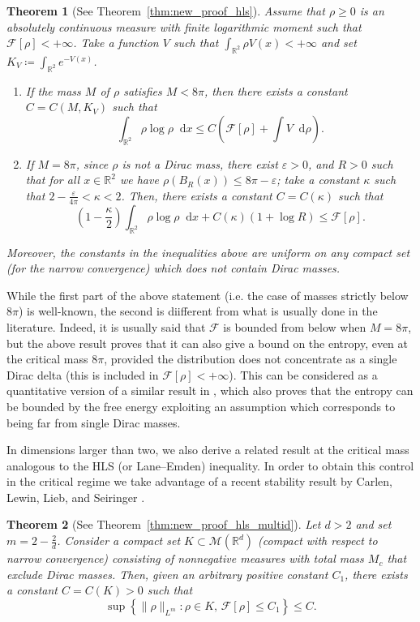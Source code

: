 \documentclass[11pt,a4paper]{article}
\numberwithin{equation}{section}
\newcommand{\R}{{\mathbb{R}}}
\theoremstyle{plain}
\newtheorem{theorem}{Theorem}[section]
\theoremstyle{remark}
\newcommand {\f}{\frac}
\newcommand{\diff}{\mathop{}\!\mathrm{d}}
\begin{document}
\begin{theorem}[See Theorem~\ref{thm:new_proof_hls}]
Assume that $\rho\ge 0$ is an absolutely continuous measure with finite logarithmic moment such that $\mathcal{F}[\rho]<+\infty$. Take a function $V$ such that $\int_{\R^2}\rho V(x)<+\infty$ and set $K_V \coloneqq \int_{\R^2}e^{-V(x)}$. 
\begin{enumerate}
    \item If the mass $M$ of $\rho$ satisfies $M<8\pi$, then there exists a constant $C=C(M,K_V)$ such that
    $$
        \int_{\R^2}\rho\log\rho\diff x\leq C \left(\mathcal{F}[\rho]+\int V\diff\rho \right).
    $$
    \item If $M=8\pi$, since $\rho$ is not a  Dirac mass,  there exist $\varepsilon>0$, and $R>0$ such that for all $x\in\R^2$ we have $\rho(
B_{R}(x))\leq 8\pi-\varepsilon$; take a constant $\kappa$ such that  $2 - \f{\varepsilon}{4\pi}<\kappa<2$. Then, there exists a constant $C=C(\kappa)$  such that
$$
\left(1-\frac{\kappa}{2}\right)\int_{\R^2}\rho\log\rho\diff x +  C(\kappa)(1+\log R)\le \mathcal{F}[\rho].
$$
\end{enumerate}
Moreover, the constants in the inequalities above are uniform on any compact set (for the narrow convergence) which does not contain Dirac masses.
\end{theorem}

While the first part of the above statement (i.e. the case of masses strictly below $8\pi$) is well-known, the second is diifferent from what is usually done in the literature. Indeed, it is usually said that $\mathcal F$ is bounded from below when $M=8\pi$, but the above result proves that it can also give a bound on the entropy, even at the critical mass $8\pi$, provided the distribution does not concentrate as a single Dirac delta (this is included in $\mathcal{F}[\rho]<+\infty$). This can be considered as a quantitative version of a similar result in \cite{KarWol}, which also proves that the entropy can be bounded by the free energy exploiting an assumption which corresponds to being far from single Dirac masses.

In dimensions larger than two, we also derive a related result at the critical mass analogous to the HLS (or Lane--Emden) inequality. In order to obtain this control in the critical regime we take advantage of a recent stability result by Carlen, Lewin, Lieb, and Seiringer \cite{Carlen_Lewin_Lieb_Seiringer24}.

\begin{theorem}[See Theorem~\ref{thm:new_proof_hls_multid}]
Let $d>2$ and set $m=2-\frac{2}{d}$. Consider a compact set $K\subset\mathcal{M}(\R^d)$ (compact with respect to narrow convergence) consisting of nonnegative measures with total mass $M_c$ that exclude Dirac masses. Then, given an arbitrary positive constant $C_1$, there exists a constant $C=C(K)>0$ such that
\[
\sup\left\{\|\rho\|_{L^m}: \rho\in K, \,  \mathcal{F}[\rho]\le C_1\right\}\le C.
\]
\end{theorem}
\end{document}
